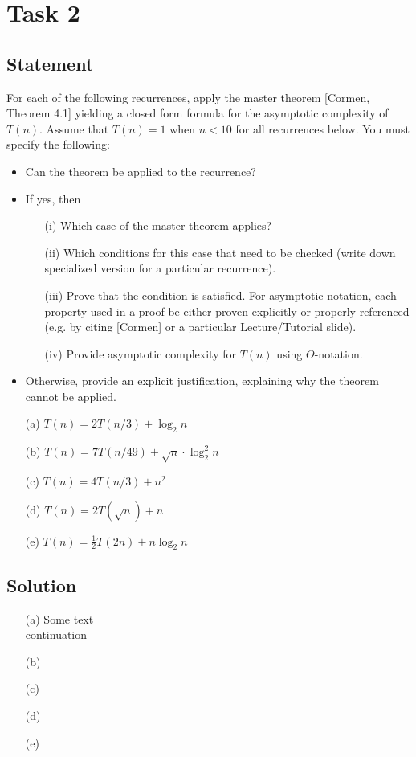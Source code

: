 \documentclass{article}
\begin{document}
\section{Task 2}
\subsection{Statement}
For each of the following recurrences, apply the master theorem [Cormen, Theorem 4.1] yielding a closed form formula for the asymptotic complexity of $T(n)$. Assume that $T(n) = 1$ when $n < 10$ for all recurrences below. You must specify the following:
\begin{itemize}
    \setlength\itemsep{0em}
    \item Can the theorem be applied to the recurrence?
    \item If yes, then
    \begin{enumerate}
        \setlength\itemsep{0em}
        \item [(i)] Which case of the master theorem applies?
        \item [(ii)] Which conditions for this case that need to be checked (write down specialized version for a particular recurrence).
        \item [(iii)] Prove that the condition is satisfied. For asymptotic notation, each property used in a proof  be either proven explicitly or properly referenced (e.g. by citing [Cormen] or a particular Lecture/Tutorial slide).
        \item [(iv)] Provide asymptotic complexity for $T(n)$ using $\Theta$-notation.
    \end{enumerate}
    \item Otherwise, provide an explicit justification, explaining why the theorem cannot be applied.
\end{itemize}
\begin{itemize}
    \setlength\itemsep{0em}
    \item [(a)] $T(n) = 2T(n/3) + \log_2n$
    \item [(b)] $T(n) = 7T(n/49) + \sqrt{n}\cdot\log_2^2 n$
    \item [(c)] $T(n) = 4T(n/3) + n^2$
    \item [(d)] $T(n) = 2T(\sqrt{n}) + n$
    \item [(e)] $T(n) = \frac{1}{2}T(2n) + n\log_2 n$
\end{itemize}

\subsection{Solution}
\begin{itemize}
    \setlength\itemsep{0em}
    \item [(a)] Some text \\
    continuation
    \item [(b)] 
    \item [(c)] 
    \item [(d)] 
    \item [(e)] 
\end{itemize}
\end{document}
